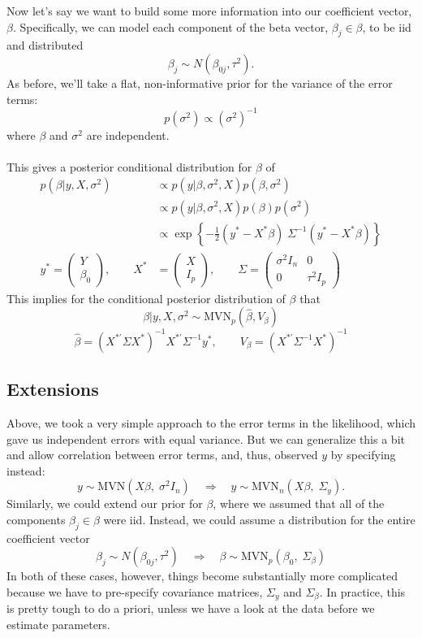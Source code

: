 \documentclass[12pt]{article}
\begin{document}
Now let's say we want to build some more information into our coefficient
vector, $\beta$. Specifically, we can model each component of the
beta vector, $\beta_j \in \beta$, to be iid and distributed
   \[ \beta_j \sim N(\beta_{0j}, \tau^2). \]
As before, we'll take a flat, non-informative prior for the variance of 
the error terms:
   \[ p(\sigma^2) \propto (\sigma^2)^{-1} \]
where $\beta$ and $\sigma^2$ are independent.
\\
\\
This gives a posterior conditional distribution for $\beta$ of 
\begin{align*}
   p(\beta | y, X, \sigma^2) &\propto p(y|\beta, \sigma^2, X) 
      p(\beta, \sigma^2) \\
   &\propto p(y|\beta, \sigma^2, X)  p(\beta) p(\sigma^2) \\
   &\propto \exp\left\{ -\frac{1}{2} (y^* - X^*\beta) \; \Sigma^{-1}
      (y^* - X^*\beta) \right\} \\
   y^* = \begin{pmatrix} Y \\ \beta_0 \end{pmatrix}, \qquad 
   X^* &= \begin{pmatrix} X \\ I_p \end{pmatrix}, \qquad 
   \Sigma = \begin{pmatrix} \sigma^2 I_n & 0 \\
      0 & \tau^2 I_p \end{pmatrix}  
\end{align*}
This implies for the conditional posterior distribution of $\beta$
that
   \[ \beta|y, X, \sigma^2 \sim \text{MVN}_p(\hat{\beta}, V_\beta) \]
   \[ \hat{\beta} = (X^{*'} \Sigma X^*)^{-1} X^{*'} \Sigma^{-1} y^*,
      \qquad V_\beta = (X^{*'} \Sigma^{-1} X^*)^{-1} \]

\subsection{Extensions}

Above, we took a very simple approach to the error terms in the 
likelihood, which gave us independent errors with equal variance.
But we can generalize this a bit and allow correlation between error
terms, and, thus, observed $y$ by specifying instead:
   \[ y \sim \text{MVN}( X\beta,\; \sigma^2 I_n)\quad \Rightarrow \quad
      y \sim \text{MVN}_n( X\beta, \;\Sigma_y).\]
Similarly, we could extend our prior for $\beta$, where we assumed that
all of the components $\beta_j \in \beta$ were iid. 
Instead, we could assume a distribution for the entire coefficient 
vector
   \[ \beta_j \sim N(\beta_{0j}, \tau^2) \quad \Rightarrow \quad
      \beta \sim \text{MVN}_p(\beta_0, \; \Sigma_\beta) \]
In both of these cases, however, things become substantially more
complicated because we have to pre-specify covariance matrices, 
$\Sigma_y$ and $\Sigma_\beta$. In practice, this is pretty tough
to do a priori, 
unless we have a look at the data before we estimate parameters.
\end{document}
